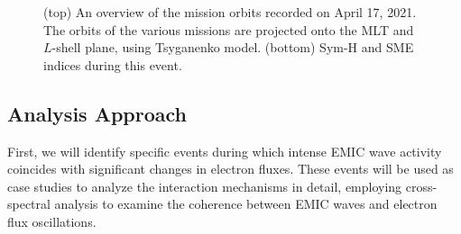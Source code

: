 \documentclass[
  letterpaper,
  DIV=11,
  numbers=noendperiod]{scrartcl}
\begin{document}
\begin{figure}


\caption{\label{fig-1}(top) An overview of the mission orbits recorded on April 17, 2021. The orbits of the various missions are projected onto the MLT and \(L\)-shell plane, using Tsyganenko model. (bottom) Sym-H and SME indices during this event.}

\end{figure}%

\subsection{Analysis Approach}\label{analysis-approach}

First, we will identify specific events during which intense EMIC wave activity coincides with significant changes in electron fluxes. These events will be used as case studies to analyze the interaction mechanisms in detail, employing cross-spectral analysis to examine the coherence between EMIC waves and electron flux oscillations.
\end{document}
